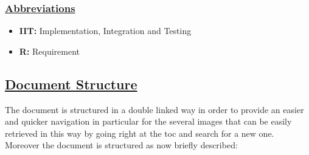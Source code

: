 		\subsubsection[Abbreviations]{\hyperlink{toc}{Abbreviations}}
			\begin{itemize}
				\item \textbf{IIT:} Implementation, Integration and Testing
				\item \textbf{R:} Requirement
			\end{itemize}
		
	\subsection[Document Structure]{\hyperlink{toc}{Document Structure}}
		\label{sec:documentStructure}
		
		The document is structured in a double linked way in order to provide an easier and quicker navigation in particular for the several images that can be easily retrieved in this way by going right at the toc and search for a new one.\\
		
		Moreover the document is structured as now briefly described:
		
